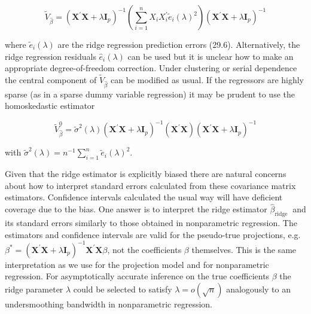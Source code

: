 \documentclass[10pt]{article}
\begin{document}
$$
\widetilde{V}_{\widehat{\beta}}=\left(\boldsymbol{X}^{\prime} \boldsymbol{X}+\lambda \boldsymbol{I}_{p}\right)^{-1}\left(\sum_{i=1}^{n} X_{i} X_{i}^{\prime} \widetilde{e}_{i}(\lambda)^{2}\right)\left(\boldsymbol{X}^{\prime} \boldsymbol{X}+\lambda \boldsymbol{I}_{p}\right)^{-1}
$$

where $\widetilde{e}_{i}(\lambda)$ are the ridge regression prediction errors (29.6). Alternatively, the ridge regression residuals $\widehat{e}_{i}(\lambda)$ can be used but it is unclear how to make an appropriate degree-of-freedom correction. Under clustering or serial dependence the central component of $\widetilde{V}_{\widehat{\beta}}$ can be modified as usual. If the regressors are highly sparse (as in a sparse dummy variable regression) it may be prudent to use the homoskedastic estimator

$$
\widetilde{V}_{\widehat{\beta}}^{0}=\widetilde{\sigma}^{2}(\lambda)\left(\boldsymbol{X}^{\prime} \boldsymbol{X}+\lambda \boldsymbol{I}_{p}\right)^{-1}\left(\boldsymbol{X}^{\prime} \boldsymbol{X}\right)\left(\boldsymbol{X}^{\prime} \boldsymbol{X}+\lambda \boldsymbol{I}_{p}\right)^{-1}
$$

with $\widetilde{\sigma}^{2}(\lambda)=n^{-1} \sum_{i=1}^{n} \widetilde{e}_{i}(\lambda)^{2}$.

Given that the ridge estimator is explicitly biased there are natural concerns about how to interpret standard errors calculated from these covariance matrix estimators. Confidence intervals calculated the usual way will have deficient coverage due to the bias. One answer is to interpret the ridge estimator $\widehat{\beta}_{\text {ridge }}$ and its standard errors similarly to those obtained in nonparametric regression. The estimators and confidence intervals are valid for the pseudo-true projections, e.g. $\beta^{*}=\left(\boldsymbol{X}^{\prime} \boldsymbol{X}+\lambda \boldsymbol{I}_{p}\right)^{-1} \boldsymbol{X}^{\prime} \boldsymbol{X} \beta$, not the coefficients $\beta$ themselves. This is the same interpretation as we use for the projection model and for nonparametric regression. For asymptotically accurate inference on the true coefficients $\beta$ the ridge parameter $\lambda$ could be selected to satisfy $\lambda=o(\sqrt{n})$ analogously to an undersmoothing bandwidth in nonparametric regression.
\end{document}
